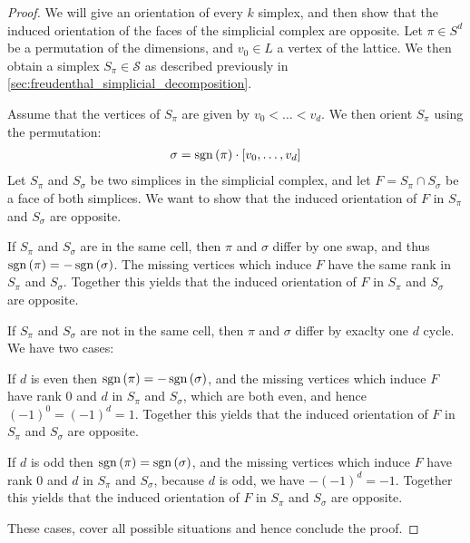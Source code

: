 \begin{proof}
    We will give an orientation of every $k$ simplex, and then show that the induced orientation of the faces of the simplicial complex are opposite.
    Let $\pi \in S^d$ be a permutation of the dimensions, and $v_0 \in L$ a vertex of the lattice. We then obtain a simplex $S_{\pi} \in \mathcal{S}$ as described previously in \cref{sec:freudenthal_simplicial_decomposition}.

    Assume that the vertices of $S_{\pi}$ are given by $v_0 < \dots < v_d$. We then orient $S_{\pi}$ using the permutation:
    \begin{align*}
        \sigma = \operatorname{sgn}\left(\pi\right) \cdot [v_0, \dots, v_d]
    \end{align*}
    Let $S_{\pi}$ and $S_{\sigma}$ be two simplices in the simplicial complex, and let $F = S_{\pi} \cap S_{\sigma}$ be a face of both simplices. We want to show that the induced orientation of $F$ in $S_{\pi}$ and $S_{\sigma}$ are opposite.
    \begin{case}{1}
        If $S_{\pi}$ and  $S_{\sigma}$ are in the same cell, then $\pi$ and $\sigma$ differ by one swap, and thus $\operatorname{sgn}\left(\pi\right) = - \operatorname{sgn}\left(\sigma\right)$. The missing vertices which induce $F$ have the same rank in $S_{\pi}$ and $S_{\sigma}$. Together this yields that the induced orientation of $F$ in $S_{\pi}$ and $S_{\sigma}$ are opposite.
    \end{case}
    \begin{case}{2}
        If $S_{\pi}$ and  $S_{\sigma}$ are not in the same cell, then $\pi$ and $\sigma$ differ by exaclty one $d$ cycle. We have two cases:
        \begin{case}{2.1}
            If $d$ is even then $\operatorname{sgn}\left(\pi\right) = - \operatorname{sgn}\left(\sigma\right)$, and the missing vertices which induce $F$ have rank $0$ and $d$ in $S_{\pi}$ and $S_{\sigma}$, which are both even, and hence $(-1)^0 = (-1)^d = 1$. Together this yields that the induced orientation of $F$ in $S_{\pi}$ and $S_{\sigma}$ are opposite.
        \end{case}
        \begin{case}{2.2}
            If $d$ is odd then $\operatorname{sgn}\left(\pi\right) = \operatorname{sgn}\left(\sigma\right)$, and the missing vertices which induce $F$ have rank $0$ and $d$ in $S_{\pi}$ and $S_{\sigma}$, because $d$ is odd, we have $-(-1)^d = -1$. Together this yields that the induced orientation of $F$ in $S_{\pi}$ and $S_{\sigma}$ are opposite.
        \end{case}
    \end{case}
    These cases, cover all possible situations and hence conclude the proof.
\end{proof}

